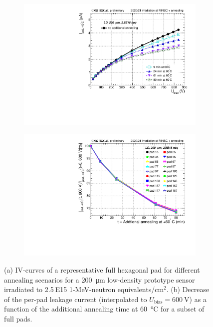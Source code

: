 \begin{figure}
	\captionsetup[subfigure]{aboveskip=-1pt,belowskip=-1pt}
	\centering
	\begin{subfigure}[b]{0.49\textwidth}
		\includegraphics[width=0.999\textwidth]{plots/annealing_iv/annealing_IV_ch24.pdf}
		\subcaption{
		}
		\label{plot:annealing_IV}
	\end{subfigure}
	\hfill
	\begin{subfigure}[b]{0.49\textwidth}
		\includegraphics[width=0.999\textwidth]{plots/annealing_iv/annealing_current.pdf}
		\subcaption{
		}
		\label{plot:annealing_current}
	\end{subfigure}
	\caption{
		(a) IV-curves of a representative full hexagonal pad for different annealing scenarios for a \SI{200}{\micro\metre} low-density prototype sensor irradiated to 2.5$~$E15 1-MeV-neutron equivalents/cm$^{2}$.
        (b) Decrease of the per-pad leakage current (interpolated to $U_\text{bias}=\SI{600}{\volt}$) as a function of the additional annealing time at \SI{60}{\celsius} for a subset of full pads.
	}
\end{figure}

